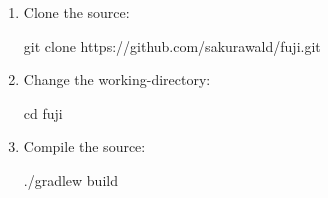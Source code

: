 \label{ch:development}


\begin{enumerate}
    \item Clone the source:
    \begin{shcode}
        git clone https://github.com/sakurawald/fuji.git
    \end{shcode}
    \item Change the working-directory:
    \begin{shcode}
        cd fuji
    \end{shcode}
    \item Compile the source:
    \begin{shcode}
              ./gradlew build
    \end{shcode}
\end{enumerate}
